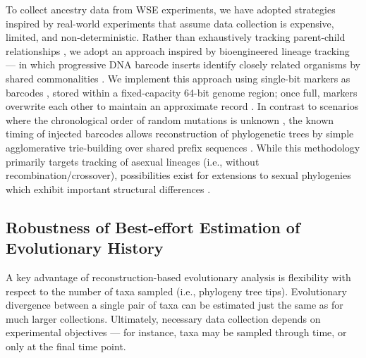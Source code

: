
To collect ancestry data from WSE experiments, we have adopted strategies inspired by real-world experiments that assume data collection is expensive, limited, and non-deterministic.
Rather than exhaustively tracking parent-child relationships \cite{dolson2023phylotrackpy}, we adopt an approach inspired by bioengineered lineage tracking \cite{moreno2022hereditary} --- in which progressive DNA barcode inserts identify closely related organisms by shared commonalities \cite{Masuyama2019,konno2022deep,jones2020inference,kebschull2018cellular,pan2026integrative,jones2024spatiotemporal}.
We implement this approach using single-bit markers as barcodes \cite{moreno2025testing}, stored within a fixed-capacity 64-bit genome region; once full, markers overwrite each other to maintain an approximate record \cite{moreno2024algorithms}.
In contrast to scenarios where the chronological order of random mutations is unknown \cite{gabor2017genealogical,moreno2021case},
the known timing of injected barcodes allows reconstruction of phylogenetic trees by simple agglomerative trie-building over shared prefix sequences \cite{moreno2023toward,singhvi2025scalable}.
While this methodology primarily targets tracking of asexual lineages (i.e., without recombination/crossover), possibilities exist for extensions to sexual phylogenies  \cite{moreno2024methods} which exhibit important structural differences \cite{mcphee2016using,godindubois2024apoget,burlacu2015methods}.

\vspace{-4.0ex}
\subsection{Robustness of Best-effort Estimation of Evolutionary History}
\vspace{-2.0ex}
\label{moreno:sec:case2:missing}

A key advantage of reconstruction-based evolutionary analysis is flexibility with respect to the number of taxa sampled (i.e., phylogeny tree tips).
Evolutionary divergence between a single pair of taxa can be estimated just the same as for much larger collections.
Ultimately, necessary data collection depends on experimental objectives --- for instance, taxa may be sampled through time, or only at the final time point.

